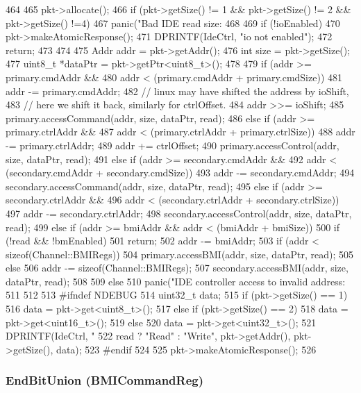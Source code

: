\begin{DoxyCode}
464 {
465     pkt->allocate();
466     if (pkt->getSize() != 1 && pkt->getSize() != 2 && pkt->getSize() !=4)
467          panic("Bad IDE read size: %
468 
469     if (!ioEnabled) {
470         pkt->makeAtomicResponse();
471         DPRINTF(IdeCtrl, "io not enabled\n");
472         return;
473     }
474 
475     Addr addr = pkt->getAddr();
476     int size = pkt->getSize();
477     uint8_t *dataPtr = pkt->getPtr<uint8_t>();
478 
479     if (addr >= primary.cmdAddr &&
480             addr < (primary.cmdAddr + primary.cmdSize)) {
481         addr -= primary.cmdAddr;
482         // linux may have shifted the address by ioShift,
483         // here we shift it back, similarly for ctrlOffset.
484         addr >>= ioShift;
485         primary.accessCommand(addr, size, dataPtr, read);
486     } else if (addr >= primary.ctrlAddr &&
487                addr < (primary.ctrlAddr + primary.ctrlSize)) {
488         addr -= primary.ctrlAddr;
489         addr += ctrlOffset;
490         primary.accessControl(addr, size, dataPtr, read);
491     } else if (addr >= secondary.cmdAddr &&
492                addr < (secondary.cmdAddr + secondary.cmdSize)) {
493         addr -= secondary.cmdAddr;
494         secondary.accessCommand(addr, size, dataPtr, read);
495     } else if (addr >= secondary.ctrlAddr &&
496                addr < (secondary.ctrlAddr + secondary.ctrlSize)) {
497         addr -= secondary.ctrlAddr;
498         secondary.accessControl(addr, size, dataPtr, read);
499     } else if (addr >= bmiAddr && addr < (bmiAddr + bmiSize)) {
500         if (!read && !bmEnabled)
501             return;
502         addr -= bmiAddr;
503         if (addr < sizeof(Channel::BMIRegs)) {
504             primary.accessBMI(addr, size, dataPtr, read);
505         } else {
506             addr -= sizeof(Channel::BMIRegs);
507             secondary.accessBMI(addr, size, dataPtr, read);
508         }
509     } else {
510         panic("IDE controller access to invalid address: %
511     }
512 
513 #ifndef NDEBUG
514     uint32_t data;
515     if (pkt->getSize() == 1)
516         data = pkt->get<uint8_t>();
517     else if (pkt->getSize() == 2)
518         data = pkt->get<uint16_t>();
519     else
520         data = pkt->get<uint32_t>();
521     DPRINTF(IdeCtrl, "%
522             read ? "Read" : "Write", pkt->getAddr(), pkt->getSize(), data);
523 #endif
524 
525     pkt->makeAtomicResponse();
526 }
\end{DoxyCode}
\hypertarget{classIdeController_a104cf32518c5d5e9cd2b85d06e4783a9}{
\subsubsection[{EndBitUnion}]{\setlength{\rightskip}{0pt plus 5cm}EndBitUnion (BMICommandReg)}}
\label{classIdeController_a104cf32518c5d5e9cd2b85d06e4783a9}


